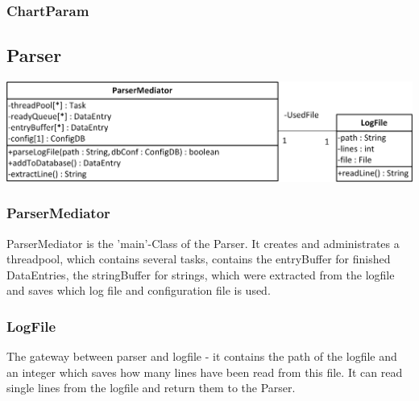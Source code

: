 \subsubsection*{ChartParam} 


\subsection{Parser}

\begin{center}
\includegraphics{Pictures/Parts/ParsMedi.png}
\end{center}  

\subsubsection*{ParserMediator}
ParserMediator is the 'main'-Class of the Parser. It creates and administrates a threadpool,
 which contains several tasks, 
contains the entryBuffer for finished DataEntries, the stringBuffer for strings,
which were extracted from the logfile and saves which log file and configuration file is used.

\subsubsection*{LogFile}
The gateway between parser and logfile - it contains the path of the logfile and an integer 
which saves how many lines have been read from this file. It can read single lines from the
logfile and return them to the Parser.

